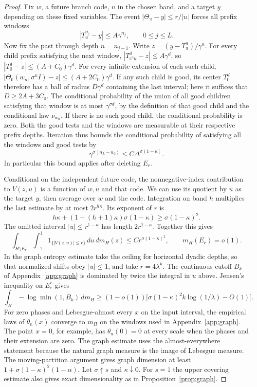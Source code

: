 \documentclass[11pt,a4paper]{article}
\begin{document}
\begin{proof}
Fix $w$, a future branch code, $u$ in the chosen band, and a target
$y$ depending on these fixed variables. The event
$|\Theta_u-y|\le r/|u|$ forces all prefix windows
\[
       |T_u^{n_j}-y|\le A\gamma^{n_j},\qquad 0\le j\le L .
\]
Now fix the past through depth $n=n_{j-1}$. Write
$z=(y-T_u^n)/\gamma^n$. For every child prefix satisfying the next
window, $|T_{c^nu}^d-z|\le A\gamma^d$, so
$|T_0^d-z|\le(A+C_0)\gamma^d$. For every infinite extension of
each such child,
$|\Theta_0(w_n,\sigma^n I)-z|\le(A+2C_0)\gamma^d$.
If any such child is good, its center $T_0^d$ therefore has a ball
of radius $D\gamma^d$ containing the last interval; here it suffices
that $D\ge 2A+3C_0$. The conditional probability of the union of all
good children satisfying that window is at most $\gamma^{\sigma d}$,
by the definition of that good child and the conditional law $\nu_{w_n}$.
If there is no such good child, the conditional probability is zero.
Both the good tests and the windows are measurable at their respective
prefix depths. Iteration thus bounds the conditional probability of
satisfying all the windows and good tests by
\[
        \gamma^{\sigma(n_L-n_0)}
                  \le C\Delta^{\sigma(1-\kappa)}.
\]
In particular this bound applies after deleting $E_r$.

Conditional on the independent future code, the nonnegative-index
contribution to $V(z,u)$ is a function of $w,u$ and that code.
We can use its quotient by $u$ as the target $y$, then average over
$w$ and the code. Integration on band $h$ multiplies the last
estimate by at most $2r^{h\kappa}$. Its exponent of $r$ is
\[
    h\kappa+(1-(h+1)\kappa)\sigma(1-\kappa)
           \ge\sigma(1-\kappa)^2.
\]
The omitted interval $|u|\le r^{1-\kappa}$ has length $2r^{1-\kappa}$.
Together this gives
\[
    \int_{H\setminus E_r}\int_{-1}^1
           \mathrm{1}_{\{|V(z,u)|\le r\}}\,du\,dm_H(z)
       \le C r^{\sigma(1-\kappa)^2},\qquad m_H(E_r)=o(1).
\]
In the graph entropy estimate take the ceiling for horizontal dyadic
depths, so that normalized shifts obey $|u|\le1$, and take $r=4\lambda^k$.
The continuous cutoff $B_k$ of Appendix~\ref{app:graph} is dominated by twice the
integral in $u$ above. Jensen's inequality on $E_r^c$ gives
\[
 \int_H-\log\min(1,B_k)\,dm_H
     \ge(1-o(1))\bigl[\sigma(1-\kappa)^2
                    k\log(1/\lambda)-O(1)\bigr].
\]
For zero phases and Lebesgue-almost every $x$ on the input interval,
the empirical laws of $\theta_n(x)$ converge to $m_H$ on the windows
used in Appendix~\ref{app:graph}. The point $x=0$, for example, has
$\theta_n(0)=0$ at every scale when the phases and their extension are
zero. The graph estimate uses the almost-everywhere statement because
the natural graph measure is the image of Lebesgue measure.
The moving-partition argument gives graph dimension at least
$1+\sigma(1-\kappa)^2(1-\alpha)$. Let $\sigma\uparrow s$ and
$\kappa\downarrow0$. For $s=1$ the upper covering estimate also
gives exact dimensionality as in Proposition~\ref{prop:graph}.
\end{proof}
\end{document}
